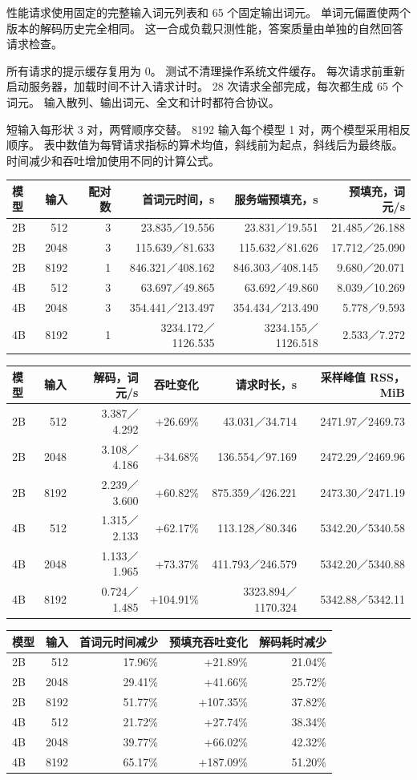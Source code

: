\documentclass[10pt,a4paper,fontset=none]{ctexart}
\begin{document}
性能请求使用固定的完整输入词元列表和 65 个固定输出词元。
单词元偏置使两个版本的解码历史完全相同。
这一合成负载只测性能，答案质量由单独的自然回答请求检查。

所有请求的提示缓存复用为 0。 测试不清理操作系统文件缓存。
每次请求前重新启动服务器，加载时间不计入请求计时。 28
次请求全部完成，每次都生成 65 个词元。
输入散列、输出词元、全文和计时都符合协议。

短输入每形状 3 对，两臂顺序交替。 8192 输入每个模型 1
对，两个模型采用相反顺序。
表中数值为每臂请求指标的算术均值，斜线前为起点，斜线后为最终版。
时间减少和吞吐增加使用不同的计算公式。

\begin{longtable}[]{@{}lrrrrr@{}}
\toprule
模型 & 输入 & 配对数 & 首词元时间，s & 服务端预填充，s &
预填充，词元/s\tabularnewline
\midrule
\endhead
2B & 512 & 3 & 23.835／19.556 & 23.831／19.551 &
21.485／26.188\tabularnewline
2B & 2048 & 3 & 115.639／81.633 & 115.632／81.626 &
17.712／25.090\tabularnewline
2B & 8192 & 1 & 846.321／408.162 & 846.303／408.145 &
9.680／20.071\tabularnewline
4B & 512 & 3 & 63.697／49.865 & 63.692／49.860 &
8.039／10.269\tabularnewline
4B & 2048 & 3 & 354.441／213.497 & 354.434／213.490 &
5.778／9.593\tabularnewline
4B & 8192 & 1 & 3234.172／1126.535 & 3234.155／1126.518 &
2.533／7.272\tabularnewline
\bottomrule
\end{longtable}

\begin{longtable}[]{@{}lrrrrr@{}}
\toprule
模型 & 输入 & 解码，词元/s & 吞吐变化 & 请求时长，s & 采样峰值
RSS，MiB\tabularnewline
\midrule
\endhead
2B & 512 & 3.387／4.292 & +26.69\% & 43.031／34.714 &
2471.97／2469.73\tabularnewline
2B & 2048 & 3.108／4.186 & +34.68\% & 136.554／97.169 &
2472.29／2469.96\tabularnewline
2B & 8192 & 2.239／3.600 & +60.82\% & 875.359／426.221 &
2473.30／2471.19\tabularnewline
4B & 512 & 1.315／2.133 & +62.17\% & 113.128／80.346 &
5342.20／5340.58\tabularnewline
4B & 2048 & 1.133／1.965 & +73.37\% & 411.793／246.579 &
5342.20／5340.88\tabularnewline
4B & 8192 & 0.724／1.485 & +104.91\% & 3323.894／1170.324 &
5342.88／5342.11\tabularnewline
\bottomrule
\end{longtable}

\begin{longtable}[]{@{}lrrrr@{}}
\toprule
模型 & 输入 & 首词元时间减少 & 预填充吞吐变化 &
解码耗时减少\tabularnewline
\midrule
\endhead
2B & 512 & 17.96\% & +21.89\% & 21.04\%\tabularnewline
2B & 2048 & 29.41\% & +41.66\% & 25.72\%\tabularnewline
2B & 8192 & 51.77\% & +107.35\% & 37.82\%\tabularnewline
4B & 512 & 21.72\% & +27.74\% & 38.34\%\tabularnewline
4B & 2048 & 39.77\% & +66.02\% & 42.32\%\tabularnewline
4B & 8192 & 65.17\% & +187.09\% & 51.20\%\tabularnewline
\bottomrule
\end{longtable}
\end{document}
